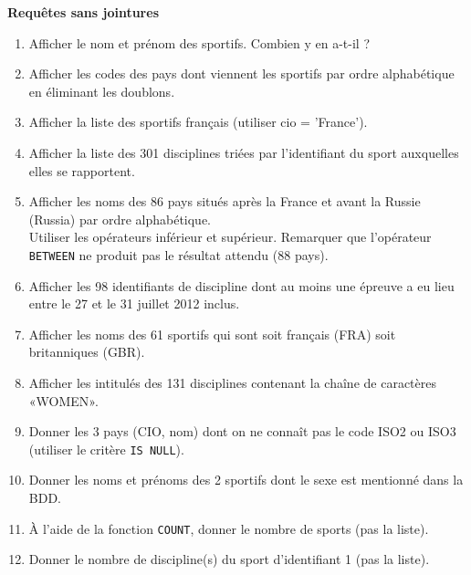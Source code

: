 \documentclass[10pt,cours,a4paper,firamath]{nsi}
\begin{document}
\begin{exercice}[ : JO]
    \textbf{Requêtes sans jointures}
    \begin{enumerate}
        \item 	Afficher le nom et prénom des sportifs. Combien y en a-t-il ?
        \item 	Afficher les codes des pays dont viennent les sportifs par ordre alphabétique en éliminant les doublons.
        \item 	Afficher la liste des sportifs français (utiliser cio = 'France').
        \item 	Afficher la liste des 301 disciplines triées par l'identifiant du sport auxquelles elles se rapportent.
        \item 	Afficher les noms des 86 pays situés après la France et avant la Russie (Russia) par ordre alphabétique.\\
              Utiliser les opérateurs inférieur et supérieur. Remarquer que l'opérateur \texttt{BETWEEN} ne produit pas le résultat attendu (88 pays).
        \item 	Afficher les 98 identifiants de discipline dont au moins une épreuve a eu lieu entre le 27 et le 31 juillet 2012 inclus.
        \item 	Afficher les noms des 61 sportifs qui sont soit français (FRA) soit britanniques (GBR).
        \item 	Afficher les intitulés des 131 disciplines contenant la chaîne de caractères «WOMEN».
              
        \item  Donner les 3 pays (CIO, nom) dont on ne connaît pas le code ISO2 ou ISO3 (utiliser le critère \texttt{IS NULL}).
        \item 	Donner les noms et prénoms des 2 sportifs dont le sexe est mentionné dans la BDD.
        \item  	À l'aide de la fonction \texttt{COUNT}, donner le nombre de sports (pas la liste).
        \item  Donner le nombre de discipline(s) du sport d'identifiant 1 (pas la liste).
              

\end{enumerate}
\end{exercice}
\end{document}

